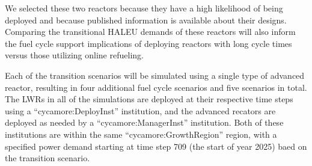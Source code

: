 We selected these two reactors because they have a high 
likelihood of being deployed and because published information is 
available about their designs. Comparing the transitional \gls{HALEU} 
demands of these reactors will also inform the fuel cycle support 
implications of deploying reactors with long cycle 
times versus those utilizing online refueling. 

Each of the transition scenarios will be simulated using a single type of 
advanced reactor, resulting in four additional fuel cycle scenarios and five 
scenarios in total. The \gls{LWR}s in all of the simulations are deployed 
at their respective time steps using a ``cycamore:DeployInst'' institution, 
and the advanced recators are deployed as needed by a ``cycamore:ManagerInst''
institution. Both of these institutions are within the same 
``cycamore:GrowthRegion'' region, with a specified power demand starting at 
time step 709 (the start of year 2025) baed on the transition scenario. 